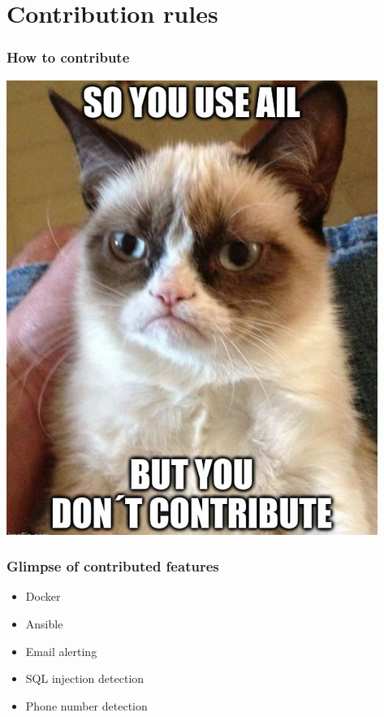 \documentclass[10pt,aspectratio=169, colorlinks=true, linkcolor=circlBlue]{beamer}
\begin{document}
\section{Contribution rules}

\begin{frame}
\frametitle{How to contribute}
    \centerline{\includegraphics[scale=0.33]{images/cat.png}}
\end{frame}

\begin{frame}
    \frametitle{Glimpse of contributed features}
    \begin{itemize}
        \item Docker
        \item Ansible
        \item Email alerting
        \item SQL injection detection
        \item Phone number detection
    \end{itemize}
\end{frame}
\end{document}
